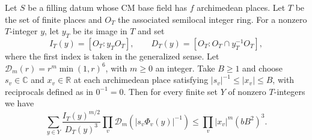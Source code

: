 \begin{lemma}
\label{lem:b-frequency-sum}
\emitthmsource
Let $S$ be a filling datum whose CM base field has $f$ archimedean places. Let $T$ be the set of finite places and $O_T$ the associated semilocal integer ring.
For a nonzero $T$-integer $y$, let $y_T$ be its image in $T$ and set
\[
 I_T(y)=[O_T:y_TO_T],\qquad
 D_T(y)=[O_T:O_T\cap y_T^{-1}O_T],
\]
where the first index is taken in the generalized sense. Let
$\mathcal D_m(r)=r^m\min(1,r)^6$, with $m\ge0$ an integer.
Take $B\ge1$ and choose $s_v\in\mathbb C$ and $x_v\in\mathbb R$ at each archimedean place
satisfying $|s_v|^{-1}\le |x_v|\le B$, with reciprocals defined as in $0^{-1}=0$.
Then for every finite set $Y$ of nonzero $T$-integers we have
\[
 \sum_{y\in Y}\frac{I_T(y)^{m/2}}{D_T(y)^3}
      \prod_v\mathcal D_m\!\left(|s_v\Phi_v(y)|^{-1}\right)
 \le \prod_v |x_v|^m(bB^2)^3 .
\]
\end{lemma}
